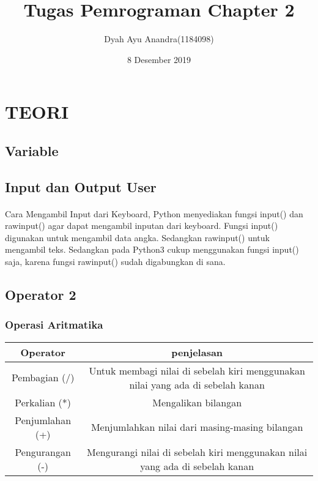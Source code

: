 \documentclass{article}
\title{Tugas Pemrograman Chapter 2}
\author{Dyah Ayu Anandra(1184098) }
\date{8 Desember 2019}
\begin{document}
\maketitle

\section{TEORI}
\subsection{Variable}
\usepackage{Variabel merupakan tempat di memori yang digunakan untuk menyimpan nilai. Saat kita akan membuat sebuah variabel, kita dapat ‘memesan’ tempat di dalam memori. Variabel nilainya dapat berubah-ubah atau mutable.Tempat  di dalam memori dapat diisi dengan data atau objek, baik itu bilangan bulat (integer), pecahan (float), karakter (string), dan lain – lain.}

\subsection{Input dan Output User}
\usepackage{Input adalah masukan perintah yang kita berikan ke program setelah itu perintah akan diproses dan menampilkan hasil outputnya.}
\paragraph{}
Cara Mengambil Input dari Keyboard, Python menyediakan fungsi input() dan rawinput() agar dapat mengambil inputan dari keyboard. Fungsi input() digunakan untuk mengambil data angka. Sedangkan rawinput() untuk mengambil teks. Sedangkan pada Python3 cukup menggunakan fungsi input() saja, karena fungsi rawinput() sudah digabungkan di sana.

\subsection{Operator 2}
\subsubsection{Operasi Aritmatika}

\begin{tabular}{|c|c|}
\hline
Operator & penjelasan\\
\hline
Pembagian (/) & Untuk membagi nilai di sebelah kiri menggunakan nilai yang ada di sebelah kanan \\
\hline
Perkalian (*) & Mengalikan bilangan\\
\hline
Penjumlahan (+) & Menjumlahkan nilai dari masing-masing bilangan\\
\hline
Pengurangan (-) & Mengurangi nilai di sebelah kiri menggunakan nilai yang ada di sebelah kanan\\
\hline
\end{tabular}
\end{document}
